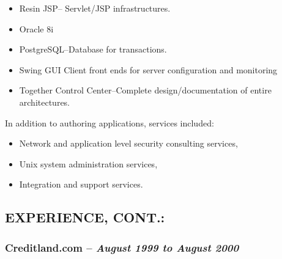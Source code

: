 \documentclass[10pt]{report}
\begin{document}
\begin{description}
\begin{list}{-}{}
\begin{itemize}
				\item{Resin JSP--} Servlet/JSP infrastructures.

				\item{Oracle 8i}

				\item{PostgreSQL--}Database for transactions.

				\item{Swing GUI Client front ends for server configuration and
				monitoring}

				\item{Together Control Center--}Complete design/documentation of entire
				architectures.

			\end{itemize}

			In addition to authoring applications, services included:

			\begin{itemize}

				\item Network and application level security consulting services,

				\item Unix system administration services,

				\item Integration and support services.

			\end{itemize}

		\end{list}

	\end{description}

\subsection*{EXPERIENCE, CONT.:}

  \subsubsection*{Creditland.com -- \emph{August 1999 to August 2000}}
\end{document}
